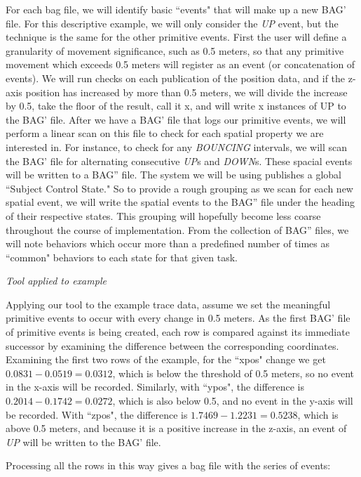 For each bag file, we will identify basic ``events" that will make up a new BAG' file.  
For this descriptive example, we will only consider the \emph{UP} event, but the technique is the same for the other primitive events.  
First the user will define a granularity of movement significance, such as 0.5 meters, so that any primitive movement which exceeds 0.5 meters will register as an event (or concatenation of events).
We will run checks on each publication of the position data, and if the z-axis position has increased by more than 0.5 meters, we will divide the increase by 0.5, take the floor of the result, call it x, and will write x instances of UP to the BAG' file.  
After we have a BAG' file that logs our primitive events, we will perform a linear scan on this file to check for each spatial property we are interested in.  
For instance, to check for any \emph{BOUNCING} intervals, we will scan the BAG' file for alternating consecutive \emph{UP}s and \emph{DOWN}s. 
These spacial events will be written to a BAG'' file.
The system we will be using publishes a global ``Subject Control State."
So to provide a rough grouping as we scan for each new spatial event, we will write the spatial events to the BAG'' file under the heading of their respective states.
This grouping will hopefully become less coarse throughout the course of implementation.
From the collection of BAG'' files, we will note behaviors which occur more than a predefined number of times as ``common" behaviors to each state for that given task.

\emph{Tool applied to example}

Applying our tool to the example trace data, assume we set the meaningful primitive events to occur with every change in 0.5 meters. 
As the first BAG' file of primitive events is being created, each row is compared against its immediate successor by examining the difference between the corresponding coordinates.
Examining the first two rows of the example, for the ``xpos" change we get $0.0831-0.0519=0.0312$, which is below the threshold of 0.5 meters, so no event in the x-axis will be recorded.  
Similarly, with ``ypos", the difference is $0.2014-0.1742=0.0272$, which is also below 0.5, and no event in the y-axis will be recorded.
With ``zpos", the difference is $1.7469-1.2231=0.5238$, which is above 0.5 meters, and because it is a positive increase in the z-axis, an event of \emph{UP} will be written to the BAG' file.

Processing all the rows in this way gives a bag file with the series of events: 

